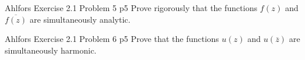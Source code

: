 \documentclass[a4paper, 11pt]{article}
\begin{document}
	
	\begin{problem}{%
			Ahlfors Exercise 2.1 Problem 5
		}{p5%
		}
		Prove rigorously that the functions $f(z)$ and $\overline{f(z)}$ are simultaneously analytic.
	\end{problem}
	
	\solve{
	}
	
	\begin{problem}{%
			Ahlfors Exercise 2.1 Problem 6
		}{p5%
		}
Prove that the functions $u(z)$ and $u(\overline{z})$ are simultaneously harmonic.
	\end{problem}
	
	\solve{
	}
	

	
\end{document}
